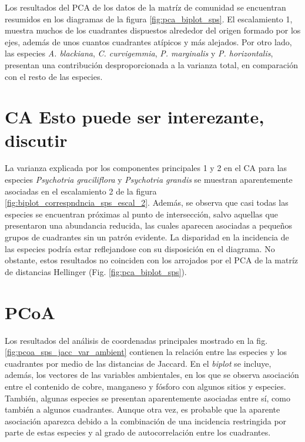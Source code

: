 \documentclass[11pt,]{article}
\begin{document}
Los resultados del PCA de los datos de la matríz de comunidad se
encuentran resumidos en los diagramas de la figura
\ref{fig:pca_biplot_sps}. El escalamiento 1, muestra muchos de los
cuadrantes dispuestos alrededor del origen formado por los ejes, además
de unos cuantos cuadrantes atípicos y más alejados. Por otro lado, las
especies \emph{A. blackiana}, \emph{C. curvigemmia}, \emph{P.
marginalis} y \emph{P. horizontalis}, presentan una contribución
desproporcionada a la varianza total, en comparación con el resto de las
especies.

\section{CA Esto puede ser interezante,
discutir}\label{ca-esto-puede-ser-interezante-discutir}

La varianza explicada por los componentes principales 1 y 2 en el CA
para las especies \emph{Psychotria graciliflora} y \emph{Psychotria
grandis} se muestran aparentemente asociadas en el escalamiento 2 de la
figura \ref{fig:biplot_correspndncia_sps_escal_2}. Además, se observa
que casi todas las especies se encuentran próximas al punto de
intersección, salvo aquellas que presentaron una abundancia reducida,
las cuales aparecen asociadas a pequeños grupos de cuadrantes sin un
patrón evidente. La disparidad en la incidencia de las especies podría
estar reflejandose con su disposición en el diagrama. No obstante, estos
resultados no coinciden con los arrojados por el PCA de la matríz de
distancias Hellinger (Fig. \ref{fig:pca_biplot_sps}).

\section{PCoA}\label{pcoa}

Los resultados del análisis de coordenadas principales mostrado en la
fig. \ref{fig:pcoa_sps_jacc_var_ambient} contienen la relación entre las
especies y los cuadrantes por medio de las distancias de Jaccard. En el
\emph{biplot} se incluye, además, los vectores de las variables
ambientales, en los que se observa asociación entre el contenido de
cobre, manganeso y fósforo con algunos sitios y especies. También,
algunas especies se presentan aparentemente asociadas entre sí, como
también a algunos cuadrantes. Aunque otra vez, es probable que la
aparente asociación aparezca debido a la combinación de una incidencia
restringida por parte de estas especies y al grado de autocorrelación
entre los cuadrantes.
\end{document}
